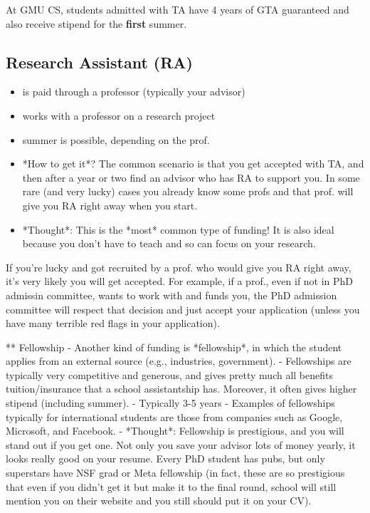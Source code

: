 \documentclass[10pt]{article}
\begin{document}


\begin{tcolorbox}[left=1pt,right=1pt,top=1pt,bottom=1pt]
At GMU CS, students admitted with TA have  4 years of GTA guaranteed and also receive  stipend for the \textbf{first} summer.
\end{tcolorbox}

\subsection{Research Assistant (RA)}
\begin{itemize}
\item is paid through a professor (typically your advisor)
\item works with a professor on a research project
\item summer is possible, depending on the prof.
\item *How to get it*?  The common scenario is that you get accepted with TA, and then after a year or two find an advisor who has RA to support you. In some rare (and very lucky) cases you already know some profs  and that prof. will give you RA right away when you start.
\item *Thought*: This is the *most* common type of funding!  It is also ideal because you don't have to teach and so can focus on your research.
\end{itemize}


\begin{tcolorbox}[left=1pt,right=1pt,top=1pt,bottom=1pt]
If you're lucky and got recruited by a prof. who would give you RA right away, it's very likely you will get accepted.  For example, if a prof., even if not in PhD admissin committee, wants to work with and funds you, the PhD admission committee will respect that decision and just accept your application (unless you have many terrible red flags in your application).
\end{tcolorbox}

** Fellowship
- Another kind of funding is *fellowship*, in which the student applies from an external source (e.g., industries, government). 
- Fellowships are typically very competitive and generous, and gives pretty much all benefits tuition/insurance that a school assistantship has.  Moreover, it often gives higher stipend (including summer).
  - Typically 3-5 years
  - Examples of fellowships typically for international students are those from companies such as Google, Microsoft, and Facebook.
- *Thought*: Fellowship is prestigious, and you will stand out if you get one.  Not only you save your advisor lots of money yearly, it looks really good on your resume.  Every PhD student has pubs, but only superstars have NSF grad or Meta fellowship (in fact, these are so prestigious that even if you didn't get it but make it to the final round, school will still mention you on their website and you still should put it on your CV).
\end{document}
